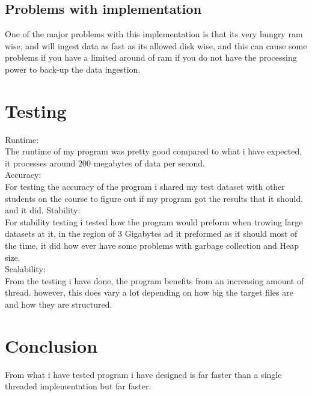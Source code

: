 \documentclass[a4paper,10pt,titlepage]{report}
\begin{document}
\subsection{Problems with implementation}
One of the major problems with this implementation is that its very hungry ram wise, and will ingest data as fast as its allowed disk wise, and this can cause some problems if you have a limited around of ram if you do not have the processing power to back-up the data ingestion.

\section{Testing}
Runtime:\\
The runtime of my program was pretty good compared to what i have expected, it processes around 200 megabytes of data per second.\\
Accuracy:\\
For testing the accuracy of the program i shared my test dataset with other students on the course to figure out if my program got the results that it should. and it did.
Stability:\\
For stability testing i tested how the program would preform when trowing large datasets at it, in the region of 3 Gigabytes ad it preformed as it should most of the time, it did how ever have some problems with garbage collection and Heap size.\\
Scalability: \\
From the testing i have done, the program benefits from an increasing amount of thread. however, this does vary a lot depending on how big the target files are and how they are structured.
\section{Conclusion}

From what i have tested program i have designed is far faster than a single threaded implementation but far faster.
\end{document}
